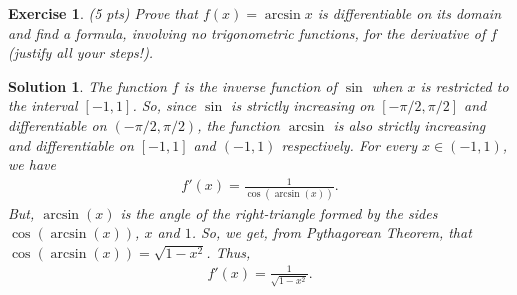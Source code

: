 \documentclass[12pt]{article}
\theoremstyle{plain}
\newtheorem{exer}{\textbf{Exercise}}}
\theoremstyle{plain}
\newtheorem*{sol}{\textbf{Solution}}}
\theoremstyle{plain}
\theoremstyle{plain}
\begin{document}
\begin{exer}
(5 pts)
Prove that $f(x) = \arcsin x$ is differentiable on its domain and find a formula, involving no trigonometric functions, for the derivative of $f$ (justify all your steps!).
\end{exer}
\begin{sol}
The function $f$ is the inverse function of $\sin$ when $x$ is restricted to the interval $[-1, 1]$. So, since $\sin$ is strictly increasing on $[-\pi/2, \pi/2]$ and differentiable on $(-\pi /2 , \pi /2 )$, the function $\arcsin$ is also strictly increasing and differentiable on $[-1, 1]$ and $(-1 , 1)$ respectively. For every $x \in (-1, 1)$, we have
	\begin{align*}
	f'(x) = \frac{1}{\cos (\arcsin (x))} .
	\end{align*}
But, $\arcsin (x)$ is the angle of the right-triangle formed by the sides $\cos (\arcsin (x))$, $x$ and $1$. So, we get, from Pythagorean Theorem, that $\cos (\arcsin (x)) = \sqrt{1 - x^2}$. Thus, 
	\begin{align*}
	f'(x)= \frac{1}{\sqrt{1 - x^2}} .
	\end{align*}
\end{sol}
\end{document}
